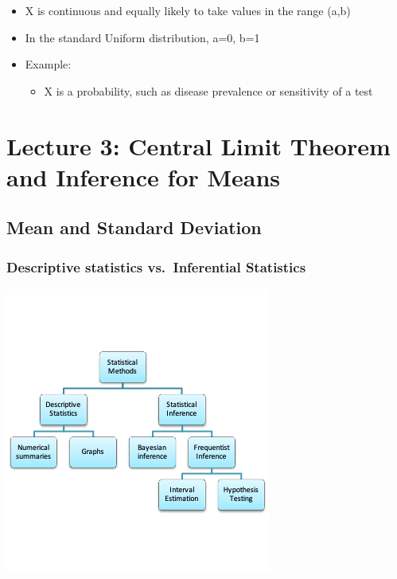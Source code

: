 \documentclass[
]{book}
\providecommand{\tightlist}{%
  \setlength{\itemsep}{0pt}\setlength{\parskip}{0pt}}
\begin{document}
\begin{itemize}
\tightlist
\item
  X is continuous and equally likely to take values in the range (a,b)
\item
  In the standard Uniform distribution, a=0, b=1
\item
  Example:

  \begin{itemize}
  \tightlist
  \item
    X is a probability, such as disease prevalence or sensitivity of a test
  \end{itemize}
\end{itemize}

\hypertarget{lecture-3-central-limit-theorem-and-inference-for-means}{%
\chapter{Lecture 3: Central Limit Theorem and Inference for Means}\label{lecture-3-central-limit-theorem-and-inference-for-means}}

\hypertarget{mean-and-standard-deviation}{%
\section{Mean and Standard Deviation}\label{mean-and-standard-deviation}}

\hypertarget{descriptive-statistics-vs.-inferential-statistics}{%
\subsection{Descriptive statistics vs.~Inferential Statistics}\label{descriptive-statistics-vs.-inferential-statistics}}

\includegraphics[width=0.5\linewidth]{./3_3}
\end{document}
